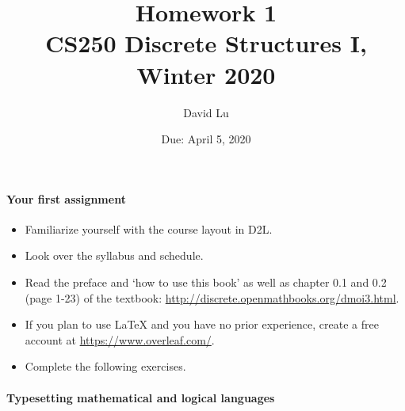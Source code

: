 \documentclass[11pt]{article} %
\title{\bf Homework 1\\[1ex]
\rm\normalsize CS250 Discrete Structures I, Winter 2020 }
\date{\normalsize Due: April 5, 2020}
\author{\normalsize David Lu}
\begin{document}

	\vspace{-4cm}\maketitle %
	
	\begin{center}
	\end{center}
	
	\paragraph{Your first assignment}
	
	\begin{itemize}
		\item Familiarize yourself with the course layout in D2L.
		\item Look over the syllabus and schedule.
		\item Read the preface and `how to use this book' as well as chapter 0.1 and 0.2 (page 1-23) of the textbook: \href{http://discrete.openmathbooks.org/dmoi3.html}{http://discrete.openmathbooks.org/dmoi3.html}.
		\item If you plan to use \LaTeX{} and you have no prior experience, create a free account at \href{https://www.overleaf.com/}{https://www.overleaf.com/}. 
		\item Complete the following exercises.
	\end{itemize}

	\paragraph{Typesetting mathematical and logical languages} 
	
\end{document}
